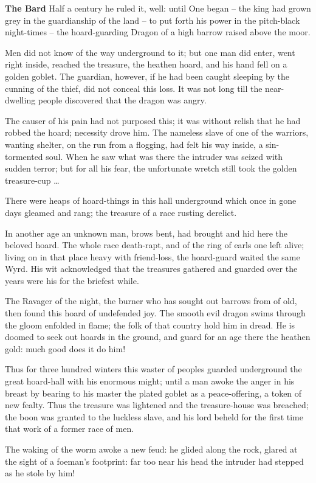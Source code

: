 \documentclass[a4paper]{article}
\begin{document}
{\textbf{The Bard} Half a century
he ruled it, well: until One began
– the king had grown grey in the guardianship of the land –
to put forth his power in the pitch-black night-times
– the hoard-guarding Dragon of a high barrow
raised above the moor.

Men did not know
of the way underground to it; but one man did enter,
went right inside, reached the treasure,
the heathen hoard, and his hand fell
on a golden goblet. The guardian, however,
if he had been caught sleeping by the cunning of the thief,
did not conceal this loss. It was not long till the near-
dwelling people discovered that the dragon was angry.

The causer of his pain had not purposed this;
it was without relish that he had robbed the hoard;
necessity drove him. The nameless slave
of one of the warriors, wanting shelter,
on the run from a flogging, had felt his way inside,
a sin-tormented soul. When he saw what was there
the intruder was seized with sudden terror;
but for all his fear, the unfortunate wretch
still took the golden treasure-cup …

There were heaps of hoard-things in this hall underground
which once in gone days gleamed and rang;
the treasure of a race rusting derelict.

In another age an unknown man,
brows bent, had brought and hid here
the beloved hoard. The whole race
death-rapt, and of the ring of earls
one left alive; living on in that place
heavy with friend-loss, the hoard-guard
waited the same Wyrd. His wit acknowledged
that the treasures gathered and guarded over the years
were his for the briefest while.

The Ravager of the night,
the burner who has sought out barrows from of old,
then found this hoard of undefended joy.
The smooth evil dragon swims through the gloom
enfolded in flame; the folk of that country
hold him in dread. He is doomed to seek out
hoards in the ground, and guard for an age there
the heathen gold: much good does it do him!

Thus for three hundred winters this waster of peoples
guarded underground the great hoard-hall
with his enormous might; until a man awoke
the anger in his breast by bearing to his master
the plated goblet as a peace-offering,
a token of new fealty. Thus the treasure was lightened
and the treasure-house was breached; the boon was granted
to the luckless slave, and his lord beheld
for the first time that work of a former race of men.

The waking of the worm awoke a new feud:
he glided along the rock, glared at the sight
of a foeman’s footprint: far too near his head
the intruder had stepped as he stole by him!

}
\end{document}
